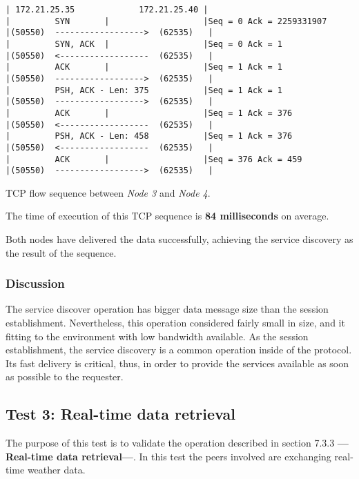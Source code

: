 \begin{table}[H]
\begin{minipage}[t]{\linewidth}
\begin{verbatim}
| 172.21.25.35             172.21.25.40 |                
|         SYN       |                   |Seq = 0 Ack = 2259331907
|(50550)  ------------------>  (62535)   |
|         SYN, ACK  |                   |Seq = 0 Ack = 1
|(50550)  <------------------  (62535)   |
|         ACK       |                   |Seq = 1 Ack = 1
|(50550)  ------------------>  (62535)   |
|         PSH, ACK - Len: 375           |Seq = 1 Ack = 1
|(50550)  ------------------>  (62535)   |
|         ACK       |                   |Seq = 1 Ack = 376
|(50550)  <------------------  (62535)   |
|         PSH, ACK - Len: 458           |Seq = 1 Ack = 376
|(50550)  <------------------  (62535)   |
|         ACK       |                   |Seq = 376 Ack = 459
|(50550)  ------------------>  (62535)   |
\end{verbatim}
\end{minipage}
\caption{\protect \gls{TCP} flow sequence between \emph{Node 3} and \emph{Node 4}.}
\end{table}
The time of execution of this \gls{TCP} sequence is \textbf{84 milliseconds} on average.

Both nodes have delivered the data successfully, achieving the service discovery as the result of the sequence.

\subsubsection{Discussion}

The service discover operation has bigger data message size than the session establishment. Nevertheless, this operation considered fairly small in size, and it fitting to the environment with low bandwidth available. As the session establishment, the service discovery is a common operation inside of the protocol. Its fast delivery is critical, thus, in order to provide the services available as soon as possible to the requester.

\subsection{Test 3: Real-time data retrieval}

The purpose of this test is to validate the operation described in section 7.3.3 \textbf{—Real-time data retrieval—}. In this test the peers involved are exchanging real-time weather data.

